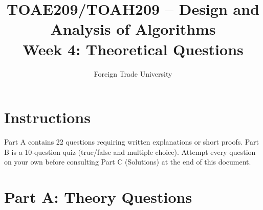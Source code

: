 \documentclass[11pt]{article}
\title{TOAE209/TOAH209 -- Design and Analysis of Algorithms\\[4pt]
\large Week 4: Theoretical Questions}
\author{Foreign Trade University}
\date{}
\begin{document}
\maketitle

\section*{Instructions}

Part A contains 22 questions requiring written explanations or short proofs. Part B is a
10-question quiz (true/false and multiple choice). Attempt every question on your own
before consulting Part C (Solutions) at the end of this document.

\section*{Part A: Theory Questions}
\end{document}
